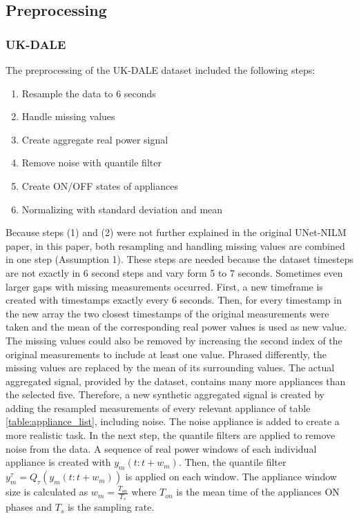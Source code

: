 \documentclass[sigconf]{acmart}
\begin{document}
\subsection{Preprocessing}\label{chapter:preprocessing_ukdale}
\subsubsection{UK-DALE}
The preprocessing of the UK-DALE dataset included the following steps:
\begin{enumerate}
  \item Resample the data to 6 seconds
  \item Handle missing values
  \item Create aggregate real power signal
  \item Remove noise with quantile filter
  \item Create ON/OFF states of appliances
  \item Normalizing with standard deviation and mean
\end{enumerate}
Because steps (1) and (2) were not further explained in the original UNet-NILM paper, in this paper, both resampling and handling missing values are combined in one step (Assumption 1).
These steps are needed because the dataset timesteps are not exactly in 6 second steps and vary form 5 to 7 seconds.
Sometimes even larger gaps with missing measurements occurred.
First, a new timeframe is created with timestamps exactly every 6 seconds.
Then, for every timestamp in the new array the two closest timestamps of the original measurements were taken and the mean of the corresponding real power values is used as new value.
The missing values could also be removed by increasing the second index of the original measurements to include at least one value.
Phrased differently, the missing values are replaced by the mean of its surrounding values.
The actual aggregated signal, provided by the dataset, contains many more appliances than the selected five.
Therefore, a new synthetic aggregated signal is created by adding the resampled measurements of every relevant appliance of table \ref{table:appliance_list}, including noise.
The noise appliance is added to create a more realistic task.
In the next step, the quantile filters are applied to remove noise from the data.
A sequence of real power windows of each individual appliance is created with $y_m(t:t + w_m)$.
Then, the quantile filter $y^\tau_m=Q_\tau(y_m(t:t + w_m))$ is applied on each window.
The appliance window size is calculated as $w_m=\frac{T_{on}}{T_s}$ where $T_{on}$ is the mean time of the appliances ON phases and $T_s$ is the sampling rate. 
\end{document}
